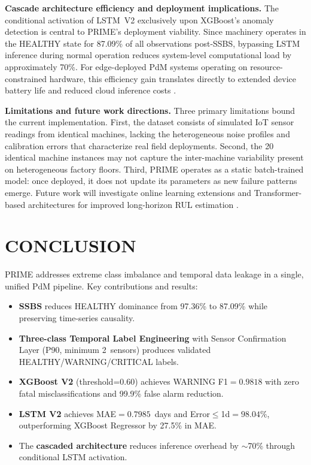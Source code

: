 \documentclass[conference]{IEEEtran}
\begin{document}
\textbf{Cascade architecture efficiency and deployment implications.} The conditional activation of LSTM~V2 exclusively upon XGBoost's anomaly detection is central to PRIME's deployment viability. Since machinery operates in the HEALTHY state for 87.09\% of all observations post-SSBS, bypassing LSTM inference during normal operation reduces system-level computational load by approximately 70\%. For edge-deployed PdM systems operating on resource-constrained hardware, this efficiency gain translates directly to extended device battery life and reduced cloud inference costs \cite{bitam2025aiot, alqaraleh2026predictive}.

\textbf{Limitations and future work directions.} Three primary limitations bound the current implementation. First, the dataset consists of simulated IoT sensor readings from identical machines, lacking the heterogeneous noise profiles and calibration errors that characterize real field deployments. Second, the 20 identical machine instances may not capture the inter-machine variability present on heterogeneous factory floors. Third, PRIME operates as a static batch-trained model: once deployed, it does not update its parameters as new failure patterns emerge. Future work will investigate online learning extensions \cite{sang2021predictive} and Transformer-based architectures for improved long-horizon RUL estimation \cite{abdelillah2023predictive}.
\section{CONCLUSION}

PRIME addresses extreme class imbalance and temporal data leakage in a
single, unified PdM pipeline. Key contributions and results:

\begin{itemize}
\item \textbf{SSBS} reduces HEALTHY dominance from 97.36\% to 87.09\%
  while preserving time-series causality.

\item \textbf{Three-class Temporal Label Engineering} with Sensor
  Confirmation Layer (P90, minimum 2~sensors) produces validated
  HEALTHY/WARNING/CRITICAL labels.

\item \textbf{XGBoost V2} (threshold=0.60) achieves WARNING F1$=0.9818$
  with zero fatal misclassifications and 99.9\% false alarm reduction.

\item \textbf{LSTM V2} achieves MAE$=0.7985$~days and Error$\leq$1d$=98.04\%$,
  outperforming XGBoost Regressor by 27.5\% in MAE.

\item The \textbf{cascaded architecture} reduces inference overhead by
  $\sim$70\% through conditional LSTM activation.
\end{itemize}
\end{document}
